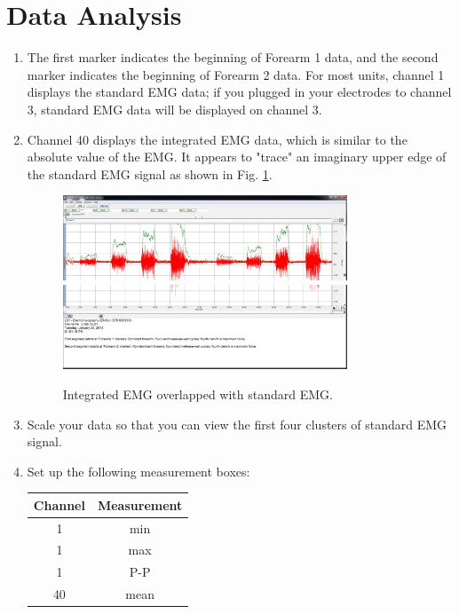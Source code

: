 \documentclass{article}
\begin{document}
\section*{Data Analysis}
\begin{enumerate}
	\item The first marker indicates the beginning of Forearm 1 data, and the second marker indicates the beginning of Forearm 2 data. For most units, channel 1 displays the standard EMG data; if you plugged in your electrodes to channel 3, standard EMG data will be displayed on channel 3.
	\item Channel 40 displays the integrated EMG data, which is similar to the absolute value of the EMG. It appears to "trace" an imaginary upper edge of the standard EMG signal as shown in Fig. \ref{integrated}.
		\begin{figure}[h]
	\includegraphics[width=0.8\textwidth]{../images/EMG_I_10a.jpg}	\includegraphics[width=0.8\textwidth]{../images/EMG_I_10b.jpg}
		\centering
		\caption{Integrated EMG overlapped with standard EMG.}
		\label{integrated}
		\end{figure}

	\item Scale your data so that you can view the first four clusters of standard EMG signal.
	\item Set up the following measurement boxes:
		\begin{table}[h!]
	\centering
	\label{meas_boxes}
	\begin{tabular}[h!]{cc}
	\toprule
	Channel & Measurement\\
	\midrule
	1 & min\\
	1 & max\\
	1 & P-P\\
	40 & mean\\
	\bottomrule
	\end{tabular}
	\end{table}
	

\end{enumerate}
\end{document}
